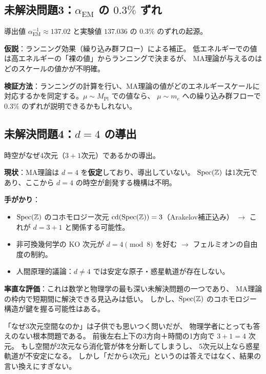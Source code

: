 \subsection{未解決問題3：$\alpha_{\mathrm{EM}}$ の $0.3\%$ ずれ}

\begin{dfnbox}
導出値 $\alpha_{\mathrm{EM}}^{-1} \approx 137.02$ と実験値 $137.036$ の
$0.3\%$ のずれの起源。

\medskip
\textbf{仮説}：ランニング効果（繰り込み群フロー）による補正。
低エネルギーでの値は高エネルギーの「裸の値」からランニングで決まるが、
MA理論が与えるのはどのスケールの値かが不明確。

\medskip
\textbf{検証方法}：ランニングの計算を行い、MA理論の値がどのエネルギースケールに
対応するかを同定する。$\mu \sim M_{\mathrm{Pl}}$ での値なら、
$\mu \sim m_e$ への繰り込み群フローで $0.3\%$ のずれが説明できるかもしれない。
\end{dfnbox}

\subsection{未解決問題4：$d = 4$ の導出}

\begin{dfnbox}
時空がなぜ4次元（$3+1$次元）であるかの導出。

\medskip
\textbf{現状}：MA理論は $d = 4$ を\textbf{仮定}しており、導出していない。
$\operatorname{Spec}(\mathbb{Z})$ は1次元であり、ここから $d = 4$ の時空が創発する機構は不明。

\medskip
\textbf{手がかり}：
\begin{itemize}
  \item $\operatorname{Spec}(\mathbb{Z})$ のコホモロジー次元 $\operatorname{cd}(\operatorname{Spec}(\mathbb{Z})) = 3$（Arakelov補正込み）
        $\to$ これが $d = 3+1$ と関係する可能性。
  \item 非可換幾何学の KO 次元が $d = 4 \pmod{8}$ を好む
        $\to$ フェルミオンの自由度の制約。
  \item 人間原理的議論：$d \neq 4$ では安定な原子・惑星軌道が存在しない。
\end{itemize}

\medskip
\textbf{率直な評価}：これは数学と物理学の最も深い未解決問題の一つであり、
MA理論の枠内で短期間に解決できる見込みは低い。
しかし、$\operatorname{Spec}(\mathbb{Z})$ のコホモロジー構造が鍵を握る可能性はある。
\end{dfnbox}

\begin{hsbox}
「なぜ3次元空間なのか」は子供でも思いつく問いだが、
物理学者にとっても答えのない根本問題である。
前後左右上下の3方向＋時間の1方向で $3+1 = 4$ 次元。
もし空間が2次元なら消化管が体を分断してしまうし、
5次元以上なら惑星軌道が不安定になる。
しかし「だから4次元」というのは答えではなく、結果の言い換えにすぎない。
\end{hsbox}

